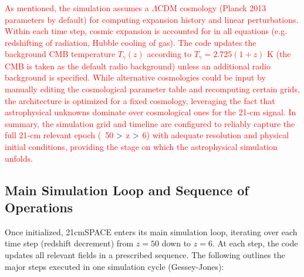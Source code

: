 \documentclass[floats,floatfix,showpacs,amssymb,prd,superscriptaddress,nofootinbib]{revtex4-2} %
\newcommand{\red}{\textcolor{red}}
\newcommand{\gt}{\ensuremath >}
\begin{document}
\red{As mentioned, the simulation assumes a $\Lambda$CDM cosmology (Planck 2013 parameters by default) for computing expansion history and linear perturbations. Within each time step, cosmic expansion is accounted for in all equations (e.g. redshifting of radiation, Hubble cooling of gas). The code updates the background CMB temperature $T_\gamma(z)$ according to $T_\gamma = 2.725(1+z)$ K (the CMB is taken as the default radio background) unless an additional radio background is specified. While alternative cosmologies could be input by manually editing the cosmological parameter table and recomputing certain grids, the architecture is optimized for a fixed cosmology, leveraging the fact that astrophysical unknowns dominate over cosmological ones for the 21-cm signal. In summary, the simulation grid and timeline are configured to reliably capture the full 21-cm relevant epoch (~50 $\gt$ z $\gt$ 6) with adequate resolution and physical initial conditions, providing the stage on which the astrophysical simulation unfolds.}

\subsection{Main Simulation Loop and Sequence of Operations}

Once initialized, 21cmSPACE enters its main simulation loop, iterating over each time step (redshift decrement) from $z=50$ down to $z=6$. At each step, the code updates all relevant fields in a prescribed sequence. The following outlines the major steps executed in one simulation cycle (Gessey-Jones):
\end{document}
